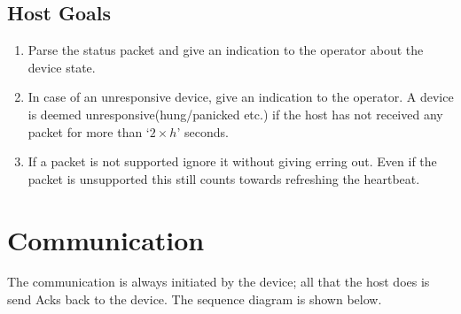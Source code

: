 \subsection{Host Goals}

\begin{enumerate}
\item Parse the status packet and give an indication to the operator about the device state.
\item In case of an unresponsive device, give an indication to the operator. A device is deemed unresponsive(hung/panicked etc.) if the host has not received any packet for more than `$2\times h$' seconds.
\item If a packet is not supported ignore it without giving erring out. Even if the packet is unsupported this still counts towards refreshing the heartbeat. 
\end{enumerate}

\section{Communication}
The communication is always initiated by the device; all that the host does is send Acks back to the device. The sequence diagram is shown below.\\


